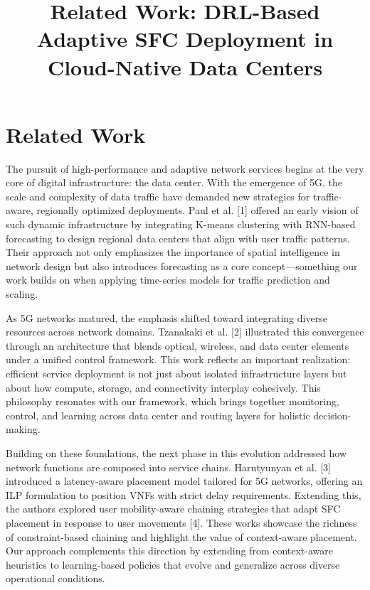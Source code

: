 \documentclass[conference]{IEEEtran}
\begin{document}
\title{Related Work: DRL-Based Adaptive SFC Deployment in Cloud-Native Data Centers}

\author{
}

\maketitle

\section{Related Work}

The pursuit of high-performance and adaptive network services begins at the very core of digital infrastructure: the data center. With the emergence of 5G, the scale and complexity of data traffic have demanded new strategies for traffic-aware, regionally optimized deployments. Paul et al. [1] offered an early vision of such dynamic infrastructure by integrating K-means clustering with RNN-based forecasting to design regional data centers that align with user traffic patterns. Their approach not only emphasizes the importance of spatial intelligence in network design but also introduces forecasting as a core concept—something our work builds on when applying time-series models for traffic prediction and scaling.

As 5G networks matured, the emphasis shifted toward integrating diverse resources across network domains. Tzanakaki et al. [2] illustrated this convergence through an architecture that blends optical, wireless, and data center elements under a unified control framework. This work reflects an important realization: efficient service deployment is not just about isolated infrastructure layers but about how compute, storage, and connectivity interplay cohesively. This philosophy resonates with our framework, which brings together monitoring, control, and learning across data center and routing layers for holistic decision-making.

Building on these foundations, the next phase in this evolution addressed how network functions are composed into service chains. Harutyunyan et al. [3] introduced a latency-aware placement model tailored for 5G networks, offering an ILP formulation to position VNFs with strict delay requirements. Extending this, the authors explored user mobility-aware chaining strategies that adapt SFC placement in response to user movements [4]. These works showcase the richness of constraint-based chaining and highlight the value of context-aware placement. Our approach complements this direction by extending from context-aware heuristics to learning-based policies that evolve and generalize across diverse operational conditions.
\end{document}
